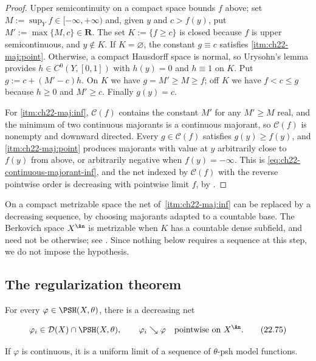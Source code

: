 \begin{proof}
Upper semicontinuity on a compact space bounds \(f\) above; set
\(M:=\sup_Yf\in[-\infty,+\infty)\) and, given \(y\) and \(c>f(y)\), put
\(M':=\max\{M,c\}\in\mathbf R\).  The set \(K:=\{f\geq c\}\) is closed
because \(f\) is upper semicontinuous, and \(y\notin K\).  If
\(K=\varnothing\), the constant \(g\equiv c\) satisfies
\cref{itm:ch22-maj:point}.  Otherwise, a compact Hausdorff space is normal,
so Urysohn's lemma provides \(h\in C^0(Y,[0,1])\) with \(h(y)=0\) and
\(h\equiv1\) on \(K\).  Put \(g:=c+(M'-c)h\).  On \(K\) we have
\(g=M'\geq M\geq f\); off \(K\) we have \(f<c\leq g\) because \(h\geq0\) and
\(M'\geq c\).  Finally \(g(y)=c\).

For \cref{itm:ch22-maj:inf}, \(\mathcal C(f)\) contains the constant \(M'\)
for any \(M'\geq M\) real, and the minimum of two continuous majorants is a
continuous majorant, so \(\mathcal C(f)\) is nonempty and downward directed.
Every \(g\in\mathcal C(f)\) satisfies \(g(y)\geq f(y)\), and
\cref{itm:ch22-maj:point} produces majorants with value at \(y\) arbitrarily
close to \(f(y)\) from above, or arbitrarily negative when
\(f(y)=-\infty\).  This is \eqref{eq:ch22-continuous-majorant-inf}, and the
net indexed by \(\mathcal C(f)\) with the reverse pointwise order is
decreasing with pointwise limit \(f\), by
.
\end{proof}

\begin{remark}
On a compact metrizable space the net of
\,\cref{itm:ch22-maj:inf} can be replaced
by a decreasing sequence, by choosing majorants adapted to a countable base.
The Berkovich space \(X^{\An}\) is metrizable when \(K\) has a countable
dense subfield, and need not be otherwise; see
.  Since nothing below requires a
sequence at this step, we do not impose the hypothesis.
\end{remark}

\subsection{The regularization theorem}

\begin{theorem}\label{thm:bfj-decreasing-regularization}
For every \(\varphi\in\PSH(X,\theta)\), there is a decreasing net

\[
              \varphi_i\in\mathcal D(X)\cap\PSH(X,\theta),
              \qquad
              \varphi_i\searrow\varphi
              \quad\text{pointwise on }X^{\An}.
\tag{22.75}\label{eq:ch22-decreasing-regularization}
\]

If \(\varphi\) is continuous, it is a uniform limit of a sequence of
\(\theta\)-psh model functions.
\end{theorem}

